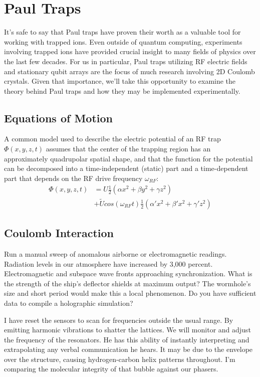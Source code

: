 \section{Paul Traps}
It's safe to say that Paul traps have proven their worth as a valuable tool for working with trapped ions. Even outside of quantum computing, experiments involving trapped ions have provided crucial insight to many fields of physics over the last few decades. For us in particular, Paul traps utilizing RF electric fields and stationary qubit arrays are the focus of much research involving 2D Coulomb crystals. Given that importance, we'll take this opportunity to examine the theory behind Paul traps and how they may be implemented experimentally.

\subsection{Equations of Motion}
A common model used to describe the electric potential of an RF trap $\Phi(x, y, z, t)$ assumes that the center of the trapping region has an approximately quadrupolar spatial shape, and that the function for the potential can be decomposed into a time-independent (static) part and a time-dependent part that depends on the RF drive frequency $\omega_{RF}$:
\begin{align}
    \Phi(x, y, z, t) &= U \frac{1}{2}(\alpha x^2 + \beta y^2 + \gamma z^2)\\ 
    \nonumber&+ {\widetilde{U}} cos(\omega_{RF}t) \frac{1}{2}(\alpha 'x^2 + \beta 'x^2 + \gamma 'z^2)
\end{align}
\subsection{Coulomb Interaction}
Run a manual sweep of anomalous airborne or electromagnetic readings. Radiation levels in our atmosphere have increased by 3,000 percent. Electromagnetic and subspace wave fronts approaching synchronization. What is the strength of the ship's deflector shields at maximum output? The wormhole's size and short period would make this a local phenomenon. Do you have sufficient data to compile a holographic simulation?

I have reset the sensors to scan for frequencies outside the usual range. By emitting harmonic vibrations to shatter the lattices. We will monitor and adjust the frequency of the resonators. He has this ability of instantly interpreting and extrapolating any verbal communication he hears. It may be due to the envelope over the structure, causing hydrogen-carbon helix patterns throughout. I'm comparing the molecular integrity of that bubble against our phasers.

